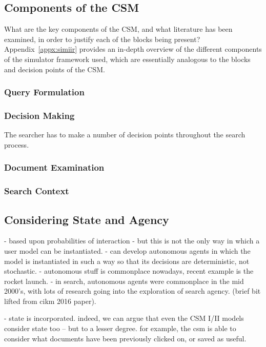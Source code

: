\subsection{Components of the CSM}
What are the key components of the CSM, and what literature has been examined, in order to justify each of the blocks being present? Appendix~\ref{appx:simiir} provides an in-depth overview of the different components of the simulator framework used, which are essentially analogous to the blocks and decision points of the CSM.

\subsubsection{Query Formulation}

\subsubsection{Decision Making}
The searcher has to make a number of decision points throughout the search process.

\subsubsection{Document Examination}

\subsubsection{Search Context}

\subsection{Considering State and Agency}
- based upon probabilities of interaction
- but this is not the only way in which a user model can be instantiated.
- can develop autonomous agents in which the model is instantiated in such a way so that its decisions are deterministic, not stochastic.
- autonomous stuff is commonplace nowadays, recent example is the rocket launch.
- in search, autonomous agents were commonplace in the mid 2000's, with lots of research going into the exploration of search agency. (brief bit lifted from cikm 2016 paper).

- state is incorporated. indeed, we can argue that even the CSM I/II models consider state too -- but to a lesser degree. for example, the csm is able to consider what documents have been previously clicked on, or saved as useful.

